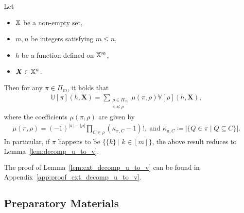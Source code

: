 \documentclass[letterpaper,11pt]{article}
\newcommand{\sPi}{\pi}
\newcommand{\ustat}{\mathbb{U}}
\newcommand{\vstat}{\mathbb{V}}
\newcommand{\samplespace}{\bbX}
\newcommand{\partition}{\Pi}
\newcommand{\partitionp}[1]{\partition_{#1}}
\newcommand{\pleq}{\preceq}
\begin{document}
\begin{bibunit}[plainnat]
\begin{lemma}
\label{lem:ext_decomp_u_to_v}
    Let
    \begin{itemize}
        \item $\samplespace$ be a non-empty set,
        \item $m,n$ be integers satisfying $m \leq n$,
        \item $h$ be a function defined on $\samplespace^m$,
        \item $\bm{X} \in \samplespace^n$. 
    \end{itemize}
    Then for any $\sPi \in \partitionp{m}$, it holds that
    \begin{align*}
        \ustat[\sPi](h,\bm{X}) 
        = \sum_{\substack{ \rho \in \partitionp{m} \\ \sPi \pleq \rho }}  
        \mu(\sPi, \rho)  \vstat[\rho](h, \bm{X}),
    \end{align*}
    where the coefficients $\mu(\sPi, \rho)$ are given by
    \begin{align*}
        \mu(\sPi, \rho) 
        = (-1)^{|\sPi|-|\rho|} 
        \prod_{C \in \rho} (\kappa_{\sPi, C} - 1)!, \text{ and } \kappa_{\sPi, C} \coloneqq |\{ Q \in \sPi \mid Q \subseteq C \}|.
    \end{align*}
    In particular, if $\sPi$ happens to be $\{\{k\} \mid k \in [m]\}$, the above result reduces to Lemma~\ref{lem:decomp_u_to_v}. 
\end{lemma}

The proof of Lemma~\ref{lem:ext_decomp_u_to_v} can be found in Appendix~\ref{app:proof_ext_decomp_u_to_v}.

\subsection{Preparatory Materials}\label{app:preparatory_materials}


\end{bibunit}
\end{document}
